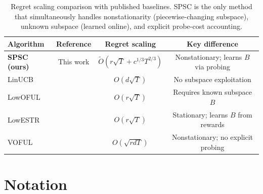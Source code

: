 \documentclass{article}
\begin{document}
\begin{table}[!htpb]
\caption{Regret scaling comparison with published baselines.
SPSC is the only method that simultaneously handles nonstationarity (piecewise-changing subspace),
unknown subspace (learned online), and explicit probe-cost accounting.}
\centering
\small
\begin{tabular}{lccc}
\toprule
Algorithm & Reference & Regret scaling & Key difference \\
\midrule
\textbf{SPSC (ours)} & This work & $\widetilde O(r\sqrt{T} + c^{1/3}T^{2/3})$ & Nonstationary; learns $B$ via probing \\
\midrule
LinUCB          & \cite{li2010contextual}       & $O(d\sqrt{T})$        & No subspace exploitation \\
LowOFUL         & \cite{jun2019bilinear}        & $O(r\sqrt{T})$        & Requires known subspace $B$ \\
LowESTR         & \cite{lu2021lowrank}              & $O(r\sqrt{T})$        & Stationary; learns $B$ from rewards \\
VOFUL           & \cite{cesabianchi2023colt}     & $O(\sqrt{rdT})$       & Nonstationary; no explicit probing \\
\bottomrule
\end{tabular}

\label{tab:published_comparison}
\end{table}

\section{Notation}
\label{app:notation}

\footnotesize
\setlength{\tabcolsep}{4pt}
\renewcommand{\arraystretch}{1.3}
\end{document}
